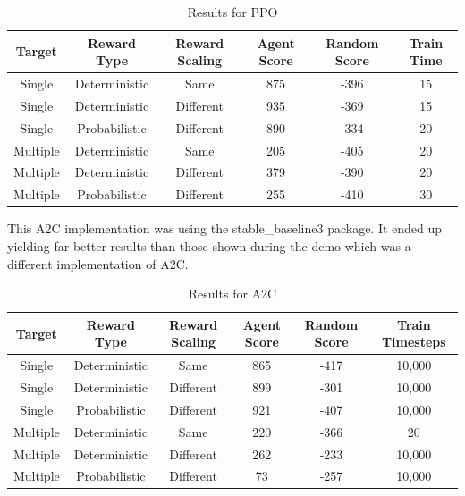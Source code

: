 \documentclass{article}
\begin{document}
    \begin{table}[h]
        \centering
        \caption[]{Results for PPO}\label{Results for PPO}%
        \begin{tabular}{cccccc}
            \toprule
            Target & Reward Type & Reward Scaling\footnotemark[1] & Agent Score\footnotemark[2] & Random Score\footnotemark[2] & Train Time\footnotemark[3]\\
            \midrule
            Single &  Deterministic & Same & 875 & -396 & 15\\
            Single & Deterministic & Different\footnotemark[4] & 935 & -369 & 15\\
            Single & Probabilistic & Different & 890 & -334 & 20\\
            \midrule
            Multiple & Deterministic & Same & 205 & -405 & 20\\
            Multiple & Deterministic & Different & 379 & -390 & 20\\
            Multiple & Probabilistic & Different & 255 & -410 & 30\\
            \bottomrule
        \end{tabular}
        \label{tab: PPO_Table}
    \end{table}
    
    This A2C implementation was using the stable_baseline3 package. It ended up yielding far better results than those shown during the demo which was a different implementation of A2C.

    \begin{table}[h]
        \centering
        \caption[]{Results for A2C}\label{Results for A2C}%
        \begin{tabular}{cccccc}
            \toprule
            Target & Reward Type & Reward Scaling\footnotemark & Agent Score\footnotemark & Random Score\footnotemark & Train Timesteps\footnotemark\\
            \midrule
            Single &  Deterministic & Same & 865 & -417 & 10,000\\
            Single & Deterministic & Different\footnotemark & 899 & -301 & 10,000\\
            Single & Probabilistic & Different & 921 & -407 & 10,000\\
            \midrule
            Multiple & Deterministic & Same & 220 & -366 & 20\\
            Multiple & Deterministic & Different & 262 & -233 & 10,000\\
            Multiple & Probabilistic & Different & 73 & -257 & 10,000\\
            \bottomrule
        \end{tabular}
        \label{tab: A2C_Table}
    \end{table}
    
\end{document}
